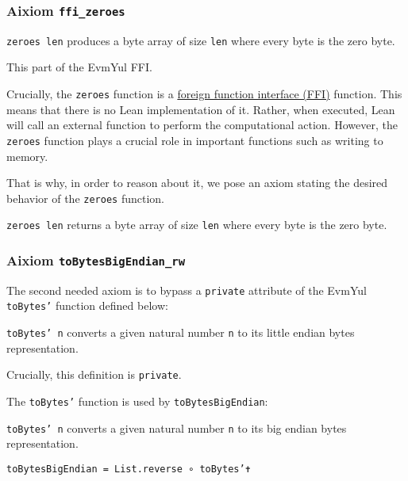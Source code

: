 \subsubsection{\textbf{Aixiom \texttt{ffi_zeroes}}}

\begin{definition}[zeroes]\label{def:zeroes}
\texttt{zeroes len} produces a byte array of size \texttt{len} where every byte
is the zero byte.

This part of the EvmYul FFI.
\end{definition}

Crucially, the \texttt{zeroes} function is a
\href{https://en.wikipedia.org/wiki/Foreign_function_interface}{foreign function interface (FFI)}
function. This means that there is no Lean implementation of it. Rather, when
executed, Lean will call an external function to perform the computational
action.
However, the \texttt{zeroes} function plays a crucial role in important
functions such as writing to memory.

That is why, in order to reason about it, we pose an axiom stating the desired
behavior of the \texttt{zeroes} function.

\begin{theorem}\label{ax:ffi_zeroes}
\texttt{zeroes len} returns a byte array of size \texttt{len} where every byte
is the zero byte.
\end{theorem}

\subsubsection{\textbf{Aixiom \texttt{toBytesBigEndian_rw}}}

The second needed axiom is to bypass a \texttt{private} attribute of the EvmYul
\texttt{toBytes'} function defined below:

\begin{definition}[toBytes']\label{def:toBytes'}\leanok
\texttt{toBytes' n} converts a given natural number \texttt{n} to its little
endian bytes representation.

Crucially, this definition is \texttt{private}.
\end{definition}

The \texttt{toBytes'} function is used by \texttt{toBytesBigEndian}:

\begin{definition}[toBytesBigEndian]
\label{def:toBytesBigEndian}\leanok
\texttt{toBytes' n} converts a given natural number \texttt{n} to its big
endian bytes representation.

\texttt{toBytesBigEndian = List.reverse ∘ toBytes'✝}
\end{definition}

